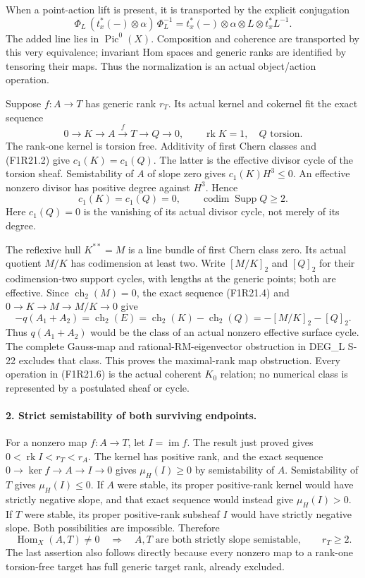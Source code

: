 When a point-action lift is present, it is transported
by the explicit conjugation
\[
 \Phi_L\,(t_x^*(-)\otimes\alpha)\,\Phi_L^{-1}
       =t_x^*(-)\otimes\alpha\otimes L\otimes t_x^*L^{-1}.
 \tag{F1R21.3}
\]
The added line lies in $\operatorname{Pic}^0(X)$.
Composition and coherence are transported by this very
equivalence; invariant Hom spaces and generic ranks
are identified by tensoring their maps. Thus the
normalization is an actual object/action operation.

Suppose $f:A\to T$ has generic rank $r_T$. Its actual
kernel and cokernel fit the exact sequence
\[
 0\longrightarrow K\longrightarrow A\xrightarrow{f}T
                          \longrightarrow Q\longrightarrow0,
 \qquad \operatorname{rk}K=1,\quad Q\text{ torsion}.
 \tag{F1R21.4}
\]
The rank-one kernel is torsion free. Additivity of
first Chern classes and (F1R21.2) give
$c_1(K)=c_1(Q)$. The latter is the effective divisor
cycle of the torsion sheaf. Semistability of $A$ of
slope zero gives $c_1(K)H^3\le0$. An effective nonzero
divisor has positive degree against $H^3$. Hence
\[
          c_1(K)=c_1(Q)=0,\qquad
                           \operatorname{codim}\operatorname{Supp}Q\ge2.
 \tag{F1R21.5}
\]
Here $c_1(Q)=0$ is the vanishing of its actual divisor
cycle, not merely of its degree.

The reflexive hull $K^{**}=M$ is a line bundle of
first Chern class zero. Its actual quotient $M/K$
has codimension at least two. Write $[M/K]_2$ and
$[Q]_2$ for their codimension-two support cycles,
with lengths at the generic points; both are effective.
Since $\operatorname{ch}_2(M)=0$, the exact sequence
(F1R21.4) and $0\to K\to M\to M/K\to0$ give
\[
 -q(A_1+A_2)=\operatorname{ch}_2(E)
       =\operatorname{ch}_2(K)-\operatorname{ch}_2(Q)
       =-[M/K]_2-[Q]_2.
 \tag{F1R21.6}
\]
Thus $q(A_1+A_2)$ would be the class of an actual
nonzero effective surface cycle. The complete Gauss-map
and rational-RM-eigenvector obstruction in DEG\_L S-22 excludes
that class. This proves the maximal-rank map obstruction.
Every operation in (F1R21.6) is the actual coherent
$K_0$ relation; no numerical class is represented by a
postulated sheaf or cycle.

\paragraph{2. Strict semistability of both surviving endpoints.}
For a nonzero map $f:A\to T$, let $I=\operatorname{im}f$.
The result just proved gives
$0<\operatorname{rk}I<r_T<r_A$. The kernel has positive
rank, and the exact sequence
$0\to\ker f\to A\to I\to0$ gives
$\mu_H(I)\ge0$ by semistability of $A$.
Semistability of $T$ gives $\mu_H(I)\le0$.
If $A$ were stable, its proper positive-rank kernel
would have strictly negative slope, and that exact
sequence would instead give $\mu_H(I)>0$.
If $T$ were stable, its proper positive-rank subsheaf
$I$ would have strictly negative slope. Both possibilities
are impossible. Therefore
\[
 \operatorname{Hom}_X(A,T)\ne0
       \quad\Longrightarrow\quad
       A,T\text{ are both strictly slope semistable},\qquad r_T\ge2.
 \tag{F1R21.7}
\]
The last assertion also follows directly because every
nonzero map to a rank-one torsion-free target has full
generic target rank, already excluded.

